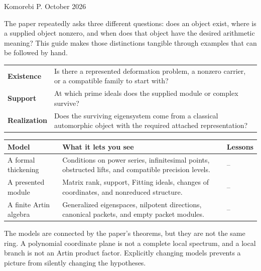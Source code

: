 {\sffamily\small Komorebi P.\quad\textbullet{} October 2026}\par
The paper repeatedly asks three different questions: does an object exist, where is a supplied object nonzero, and when does that object have the desired arithmetic meaning? This guide makes those distinctions tangible through examples that can be followed by hand.

\begin{insight}
\begin{tabularx}{\linewidth}{@{}p{.18\linewidth}Y@{}}
\textbf{Existence} & Is there a represented deformation problem, a nonzero carrier, or a compatible family to start with?\\[3pt]
\textbf{Support} & At which prime ideals does the supplied module or complex survive?\\[3pt]
\textbf{Realization} & Does the surviving eigensystem come from a classical automorphic object with the required attached representation?
\end{tabularx}
\end{insight}

\begin{tabularx}{\linewidth}{@{}p{.20\linewidth}Y>{\raggedright\arraybackslash}p{.15\linewidth}@{}}\toprule
\textbf{Model} & \textbf{What it lets you see} & \textbf{Lessons}\\\midrule
A formal thickening & Conditions on power series, infinitesimal points, obstructed lifts, and compatible precision levels. & --\\
A presented module & Matrix rank, support, Fitting ideals, changes of coordinates, and nonreduced structure. & --\\
A finite Artin algebra & Generalized eigenspaces, nilpotent directions, canonical packets, and empty packet modules. & --\\\bottomrule
\end{tabularx}

The models are connected by the paper's theorems, but they are not the same ring. A polynomial coordinate plane is not a complete local spectrum, and a local branch is not an Artin product factor. Explicitly changing models prevents a picture from silently changing the hypotheses.

